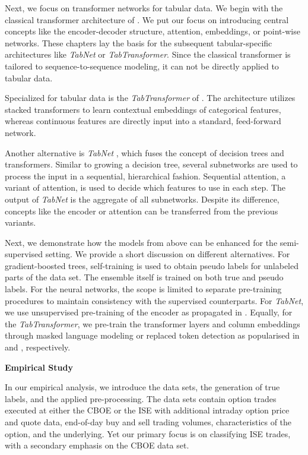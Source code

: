 Next, we focus on transformer networks for tabular data. We begin with the classical transformer architecture of \textcite{vaswaniAttentionAllYou2017}. We put our focus on introducing central concepts like the encoder-decoder structure, attention, embeddings, or point-wise networks. These chapters lay the basis for the subsequent tabular-specific architectures like \textit{TabNet} or \textit{TabTransformer}. Since the classical transformer is tailored to sequence-to-sequence modeling, it can not be directly applied to tabular data.

Specialized for tabular data is the \textit{TabTransformer} of \textcite{huangTabTransformerTabularData2020}. The architecture utilizes stacked transformers to learn contextual embeddings of categorical features, whereas continuous features are directly input into a standard, feed-forward network.

Another alternative is \textit{TabNet} \autocite{arikTabNetAttentiveInterpretable2020}, which fuses the concept of decision trees and transformers. Similar to growing a decision tree, several subnetworks are used to process the input in a sequential, hierarchical fashion. Sequential attention, a variant of attention, is used to decide which features to use in each step. The output of \textit{TabNet} is the aggregate of all subnetworks. Despite its difference, concepts like the encoder or attention can be transferred from the previous variants. 

Next, we demonstrate how the models from above can be enhanced for the semi-supervised setting. We provide a short discussion on different alternatives. For gradient-boosted trees, self-training \autocite{yarowskyUnsupervisedWordSense1995} is used to obtain pseudo labels for unlabeled parts of the data set. The ensemble itself is trained on both true and pseudo labels. For the neural networks, the scope is limited to separate pre-training procedures to maintain consistency with the supervised counterparts. For \textit{TabNet}, we use unsupervised pre-training of the encoder as propagated in \textcite{arikTabNetAttentiveInterpretable2020}. Equally, for the \textit{TabTransformer}, we pre-train the transformer layers and column embeddings through masked language modeling or replaced token detection as popularised in \textcite{devlinBERTPretrainingDeep2019} and \textcite{clarkELECTRAPretrainingText2020}, respectively. 

\textbf{Empirical Study}

In our empirical analysis, we introduce the data sets, the generation of true labels, and the applied pre-processing. The data sets contain option trades executed at either the \gls{CBOE} or the \gls{ISE} with additional intraday option price and quote data, end-of-day buy and sell trading volumes, characteristics of the option, and the underlying. Yet our primary focus is on classifying \gls{ISE} trades, with a secondary emphasis on the \gls{CBOE} data set. 

